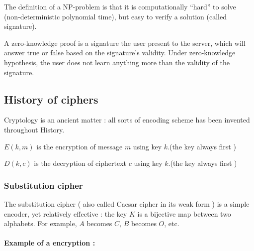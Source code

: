 The definition of a NP-problem is that it is computationally ``hard'' to solve (non-deterministic polynomial time), but easy to verify a solution (called signature).

A zero-knowledge proof is a signature the user present to the server, which will answer true or false based on the signature's validity. Under zero-knowledge hypothesis, the user does not learn anything more than the validity of the signature.

\subsection{History of ciphers}

Cryptology is an ancient matter : all sorts of encoding scheme has been invented throughout History. 

\begin{mydef}
	$E(k,m)$ is the encryption of message $m$ using key $k$.(the key always first ) 
\end{mydef}
\begin{mydef}
	$D(k,c)$ is the decryption of ciphertext $c$ using key $k$.(the key always first ) 
\end{mydef}

\subsubsection{Substitution cipher }
The substitution cipher ( also called Caesar cipher in its weak form ) is a simple encoder, yet relatively effective : the key $K$ is a bijective map between two alphabets. For example, $A$ becomes $C$, $B$ becomes $O$, etc.\\

\begin{table}[h!]
    \centering
	\caption{Exemple of a substitution table}
	\label{tab:SubstitionTable}
\end{table}

\paragraph{Example of a encryption : }


